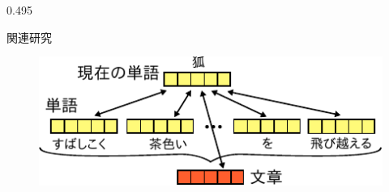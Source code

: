 \documentclass[unicode,10pt]{beamer}
\newcommand{\columnsize}{0.495\textwidth}
\begin{document}
\begin{frame}
\begin{columns}[onlytextwidth,t]
\begin{column}{\columnsize}
\begin{block}{関連研究}
\begin{itemize}
    \end{itemize}
    \begin{figure}
      \includegraphics[width=0.8\linewidth]{fig/paragraph_vector.pdf}
    \end{figure}
  \end{block}
\end{column}


\end{columns}
\end{frame}
\end{document}
